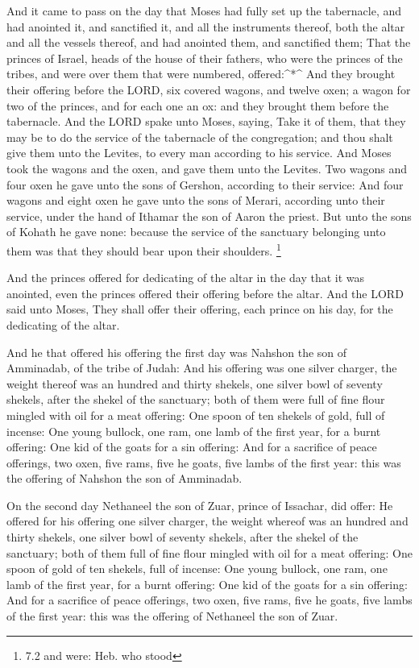  And it came to pass on the day that Moses had fully set up
the tabernacle, and had anointed it, and sanctified it, and all the
instruments thereof, both the altar and all the vessels thereof, and had
anointed them, and sanctified them;  That the princes of
Israel, heads of the house of their fathers, who were the princes of the
tribes, and were over them that were numbered, offered:\^{}*\^{}
 And they brought their offering before the LORD, six
covered wagons, and twelve oxen; a wagon for two of the princes, and for
each one an ox: and they brought them before the tabernacle.
 And the LORD spake unto Moses, saying,  Take it
of them, that they may be to do the service of the tabernacle of the
congregation; and thou shalt give them unto the Levites, to every man
according to his service.  And Moses took the wagons and the
oxen, and gave them unto the Levites.  Two wagons and four
oxen he gave unto the sons of Gershon, according to their service:
 And four wagons and eight oxen he gave unto the sons of
Merari, according unto their service, under the hand of Ithamar the son
of Aaron the priest.  But unto the sons of Kohath he gave
none: because the service of the sanctuary belonging unto them was that
they should bear upon their shoulders. \footnote{7.2 and were: Heb. who
  stood}

 And the princes offered for dedicating of the altar in the
day that it was anointed, even the princes offered their offering before
the altar.  And the LORD said unto Moses, They shall offer
their offering, each prince on his day, for the dedicating of the altar.

 And he that offered his offering the first day was Nahshon
the son of Amminadab, of the tribe of Judah:  And his
offering was one silver charger, the weight thereof was an hundred and
thirty shekels, one silver bowl of seventy shekels, after the shekel of
the sanctuary; both of them were full of fine flour mingled with oil for
a meat offering:  One spoon of ten shekels of gold, full of
incense:  One young bullock, one ram, one lamb of the first
year, for a burnt offering:  One kid of the goats for a sin
offering:  And for a sacrifice of peace offerings, two
oxen, five rams, five he goats, five lambs of the first year: this was
the offering of Nahshon the son of Amminadab.

 On the second day Nethaneel the son of Zuar, prince of
Issachar, did offer:  He offered for his offering one
silver charger, the weight whereof was an hundred and thirty shekels,
one silver bowl of seventy shekels, after the shekel of the sanctuary;
both of them full of fine flour mingled with oil for a meat offering:
 One spoon of gold of ten shekels, full of incense:
 One young bullock, one ram, one lamb of the first year,
for a burnt offering:  One kid of the goats for a sin
offering:  And for a sacrifice of peace offerings, two
oxen, five rams, five he goats, five lambs of the first year: this was
the offering of Nethaneel the son of Zuar.

